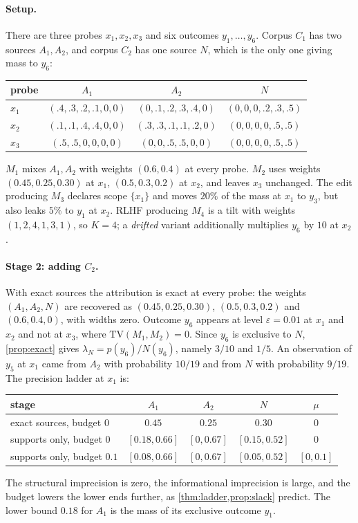 \documentclass[11pt]{article}
\theoremstyle{definition}
\theoremstyle{remark}
\newcommand{\TV}{\mathrm{TV}}
\begin{document}
\paragraph{Setup.} There are three probes $x_1,x_2,x_3$ and six outcomes $y_1,\dots,y_6$. Corpus $C_1$
has two sources $A_1,A_2$, and corpus $C_2$ has one source $N$, which is the only one giving mass to
$y_6$:
\begin{center}\small
\begin{tabular}{@{}lccc@{}}
\toprule
probe & $A_1$ & $A_2$ & $N$\\
\midrule
$x_1$ & $(.4,.3,.2,.1,0,0)$ & $(0,.1,.2,.3,.4,0)$ & $(0,0,0,.2,.3,.5)$\\
$x_2$ & $(.1,.1,.4,.4,0,0)$ & $(.3,.3,.1,.1,.2,0)$ & $(0,0,0,0,.5,.5)$\\
$x_3$ & $(.5,.5,0,0,0,0)$ & $(0,0,.5,.5,0,0)$ & $(0,0,0,0,.5,.5)$\\
\bottomrule
\end{tabular}
\end{center}
$M_1$ mixes $A_1,A_2$ with weights $(0.6,0.4)$ at every probe. $M_2$ uses weights $(0.45,0.25,0.30)$ at
$x_1$, $(0.5,0.3,0.2)$ at $x_2$, and leaves $x_3$ unchanged. The edit producing $M_3$ declares scope
$\{x_1\}$ and moves $20\%$ of the mass at $x_1$ to $y_3$, but also leaks $5\%$ to $y_1$ at $x_2$. RLHF
producing $M_4$ is a tilt with weights $(1,2,4,1,3,1)$, so $K=4$; a \emph{drifted} variant additionally
multiplies $y_6$ by $10$ at $x_2$.

\paragraph{Stage 2: adding $C_2$.} With exact sources the attribution is exact at every probe: the
weights $(A_1,A_2,N)$ are recovered as $(0.45,0.25,0.30)$, $(0.5,0.3,0.2)$ and $(0.6,0.4,0)$, with widths
zero. Outcome $y_6$ appears at level $\varepsilon=0.01$ at $x_1$ and $x_2$ and not at $x_3$, where
$\TV(M_1,M_2)=0$. Since $y_6$ is exclusive to $N$, \cref{prop:exact} gives $\lambda_N=p(y_6)/N(y_6)$,
namely $3/10$ and $1/5$. An observation of $y_5$ at $x_1$ came from $A_2$ with probability $10/19$ and
from $N$ with probability $9/19$. The precision ladder at $x_1$ is:
\begin{center}\small
\begin{tabular}{@{}lcccc@{}}
\toprule
stage & $A_1$ & $A_2$ & $N$ & $\mu$\\
\midrule
exact sources, budget $0$ & $0.45$ & $0.25$ & $0.30$ & $0$\\
supports only, budget $0$ & $[0.18,0.66]$ & $[0,0.67]$ & $[0.15,0.52]$ & $0$\\
supports only, budget $0.1$ & $[0.08,0.66]$ & $[0,0.67]$ & $[0.05,0.52]$ & $[0,0.1]$\\
\bottomrule
\end{tabular}
\end{center}
The structural imprecision is zero, the informational imprecision is large, and the budget lowers the
lower ends further, as \cref{thm:ladder,prop:slack} predict. The lower bound $0.18$ for $A_1$ is the mass of
its exclusive outcome $y_1$.
\end{document}
